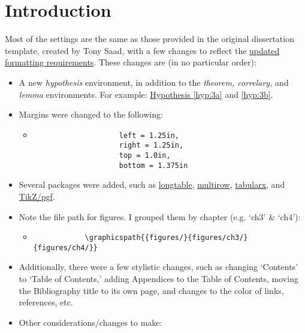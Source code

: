\chapter{Introduction} \label{ch:intro}

Most of the settings are the same as those provided in the original dissertation template, created by Tony Saad, with a few changes to reflect the  \href{http://gradschool.utk.edu/thesesdissertations/}{updated formatting requirements}. These changes are (in no particular order):

 \begin{itemize} 
 	\item A new \textit{hypothesis} environment, in addition to the \textit{theorem, correlary,} and \textit{lemma} environments. For example: \hyperref[hyp:3a]{Hypothesis \ref{hyp:3a}} and \ref{hyp:3b}. 
 	\item Margins were changed to the following:
	 	\begin{itemize} \setlength{\itemsep}{0pt} 
	 		\item[] \begin{verbatim}
			 		left = 1.25in,
			 		right = 1.25in,
			 		top = 1.0in,
			 		bottom = 1.375in
			 		\end{verbatim} \vspace*{-2em}
	 	\end{itemize}
	 \item 	Several packages were added, such as \href{https://www.ctan.org/pkg/longtable?lang=en}{\textsf{longtable}},  \href{https://www.ctan.org/pkg/multirow}{\textsf{multirow}}, \href{https://www.ctan.org/pkg/tabularx}{\textsf{tabularx}}, and \href{https://www.ctan.org/pkg/pgf}{\textsf{TikZ/pgf}}. 
	 \item Note the file path for figures. I grouped them by chapter (e.g. `ch3' \& `ch4'):
		 \begin{itemize}
		 	\item[] \begin{verbatim}
		 	\graphicspath{{figures/}{figures/ch3/}{figures/ch4/}}
		 	\end{verbatim} \vspace*{-2em}
		 \end{itemize}
 	\item Additionally, there were a few stylistic changes, such as changing `Contents' to `Table of Contents,' adding Appendices to the Table of Contents, moving the Bibliography title to its own page, and changes to the color of links, references, etc. 
 	\item Other considerations/changes to make:

\end{itemize}

